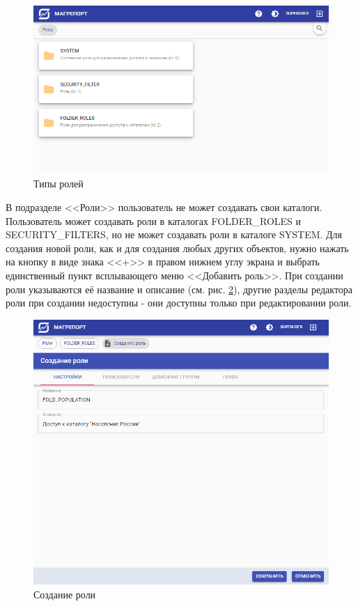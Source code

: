 \documentclass[../user-manual.tex]{subfiles}
\begin{document}
	\begin{figure}[h]
		\centering
		\includegraphics[width=\graphicswidth]{img/01-roles-folders.png}
		\caption{Типы ролей}
		\label{fig:roles-folders}
	\end{figure}

	В подразделе <<Роли>> пользователь не может создавать свои каталоги. Пользователь может создавать роли в каталогах FOLDER\_ROLES и SECURITY\_FILTERS, но не может создавать роли в каталоге SYSTEM. Для создания новой роли, как и для создания любых других объектов, нужно нажать на кнопку в виде знака <<+>> в правом нижнем углу экрана и выбрать единственный пункт всплывающего меню <<Добавить роль>>. При создании роли указываются её название и описание (см. рис. \ref{fig:create-role}), другие разделы редактора роли при создании недоступны - они доступны только при редактировании роли.
	
	
	\begin{figure}[h]
		\centering
		\includegraphics[width=\graphicswidth]{img/02-create-role.png}
		\caption{Создание роли}
		\label{fig:create-role}
	\end{figure}
\end{document}
